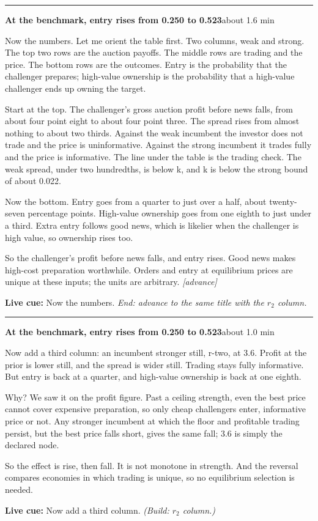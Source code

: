 \documentclass[11pt]{article}
\newcommand{\Advance}{\textcolor{ScriptGray}{\textit{[advance]}}}
\newcommand{\Cue}[1]{\par\nobreak\smallskip\noindent
  \textcolor{ScriptGray}{\footnotesize\textbf{Live cue:} #1}\par}
\newcommand{\scriptframe}[3]{%
  \Needspace{9\baselineskip}%
  \par\medskip\noindent\textcolor{ScriptBlue}{\rule{\linewidth}{0.55pt}}%
  \par\smallskip\noindent
  \textbf{#1}\hfill\textcolor{ScriptGray}{\small #2}\par\smallskip
  #3\par}
\begin{document}
\scriptframe{At the benchmark, entry rises from 0.250 to 0.523}{about 1.6 min}{%
  Now the numbers. Let me orient the table first. Two columns, weak and strong.
  The top two rows are the auction payoffs. The middle rows are trading and the
  price. The bottom rows are the outcomes. Entry is the probability that the
  challenger prepares; high-value ownership is the probability that a
  high-value challenger ends up owning the target.

  Start at the top. The challenger's gross auction profit before news falls,
  from about four point eight to about four point three. The spread rises from almost nothing
  to about two thirds.
  Against the weak incumbent the investor does not trade and the price is
  uninformative. Against the strong incumbent it trades fully and the price is
  informative. The line under the table is the trading check. The weak spread,
  under two hundredths, is below k, and k is below the strong bound of about
  0.022.

  Now the bottom. Entry goes from a quarter to just over a half, about
  twenty-seven percentage points.
  High-value ownership goes from one eighth to just under a third.
  Extra entry follows good news, which is likelier when the challenger is high
  value, so ownership rises too.

  So the challenger's profit before news falls, and entry rises. Good news
  makes high-cost preparation worthwhile. Orders and entry at equilibrium
  prices are unique at these inputs; the units are arbitrary. \Advance
  \Cue{Now the numbers. \textit{End: advance to the same title with the $r_2$ column.}}
}

\scriptframe{At the benchmark, entry rises from 0.250 to 0.523}{about 1.0 min}{%
  Now add a third column: an incumbent stronger still, r-two, at 3.6.
  Profit at the prior is lower still, and the spread is wider still. Trading
  stays fully informative. But entry is back at a quarter, and high-value
  ownership is back at one eighth.

  Why? We saw it on the profit figure. Past a ceiling strength, even the best
  price cannot cover expensive preparation, so only cheap challengers enter,
  informative price or not. Any stronger incumbent at which the floor and
  profitable trading persist, but the best price falls short, gives the same
  fall; 3.6 is simply the declared node.

  So the effect is rise, then fall. It is not monotone in strength. And the
  reversal compares economies in which trading is unique, so no equilibrium
  selection is needed.
  \Cue{Now add a third column. \textit{(Build: $r_2$ column.)}}
}
\end{document}
